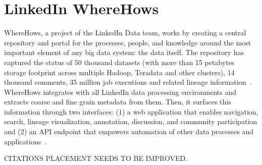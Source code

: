 \section{LinkedIn WhereHows}

WhereHows, a project of the LinkedIn Data team, works by creating a central
repository and portal for the processes, people, and knowledge around the most
important element of any big data system: the data itself. The repository has
captured the status of 50 thousand datasets (with more than 15 petabytes storage
footprint across multiple Hadoop, Teradata and other clusters), 14 thousand
comments, 35 million job executions and related lineage
information~\cite{wherehows-web}. WhereHows integrates with all LinkedIn data
processing environments and extracts coarse and fine grain metadata from them.
Then, it surfaces this information through two interfaces: (1) a web application
that enables navigation, search, lineage visualization, annotation, discussion,
and community participation and (2) an API endpoint that empowers automation of
other data processes and applications~\cite{wherehows-githubwiki}.
 
CITATIONS PLACEMENT NEEDS TO BE IMPROVED.

